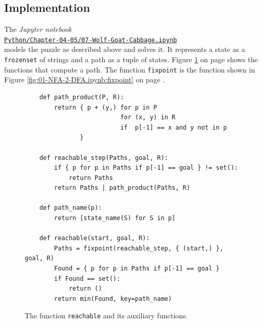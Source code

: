 \subsection{Implementation}
The \textsl{Jupyter notebook}
\\[0.2cm]
\hspace*{1.3cm}
\href{https://github.com/karlstroetmann/Formal-Languages/blob/master/Python/Chapter-04-05/07-Wolf-Goat-Cabbage.ipynb}{\texttt{Python/Chapter-04-05/07-Wolf-Goat-Cabbage.ipynb}}
\\[0.2cm]
models the puzzle as described above and solves it.  It represents a state as a \texttt{frozenset} of strings and a
path as a tuple of states.  Figure \ref{fig:07-Wolf-Goat-Cabbage.ipynb:reachable} on page
\pageref{fig:07-Wolf-Goat-Cabbage.ipynb:reachable} shows the functions that compute a path.  The function
\texttt{fixpoint} is the function shown in Figure \ref{fig:01-NFA-2-DFA.ipynb:fixpoint} on page
\pageref{fig:01-NFA-2-DFA.ipynb:fixpoint}.

\begin{figure}[!ht]
\centering
\begin{verbatim}
    def path_product(P, R):
        return { p + (y,) for p in P
                          for (x, y) in R
                          if  p[-1] == x and y not in p
               }

    def reachable_step(Paths, goal, R):
        if { p for p in Paths if p[-1] == goal } != set():
            return Paths
        return Paths | path_product(Paths, R)

    def path_name(p):
        return [state_name(S) for S in p]

    def reachable(start, goal, R):
        Paths = fixpoint(reachable_step, { (start,) }, goal, R)
        Found = { p for p in Paths if p[-1] == goal }
        if Found == set():
            return ()
        return min(Found, key=path_name)
\end{verbatim}
\vspace*{-0.3cm}
\caption{The function \texttt{reachable} and its auxiliary functions.}
\label{fig:07-Wolf-Goat-Cabbage.ipynb:reachable}
\end{figure}

